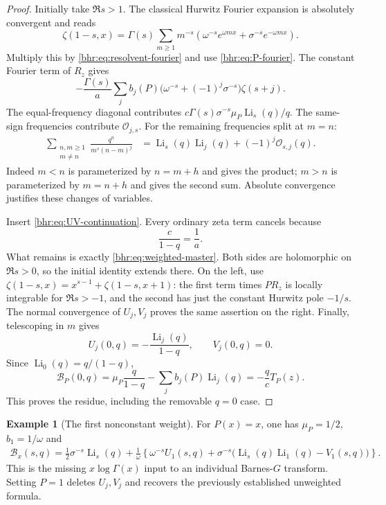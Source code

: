 \documentclass[11pt]{article}
\numberwithin{equation}{section}
\theoremstyle{plain}
\theoremstyle{definition}
\newtheorem{example}[theorem]{Example}
\theoremstyle{remark}
\DeclareMathOperator{\Li}{Li}
\begin{document}
\begin{proof}
Initially take $\Re s>1$. The classical Hurwitz Fourier expansion
\cite[\S25.11]{bhr:DLMFZ} is absolutely convergent and reads
\begin{equation}\label{bhr:eq:hurwitz-fourier}
 \zeta(1-s,x)=\Gamma(s)\sum_{m\ge1}m^{-s}
       \left(\omega^{-s}e^{\omega mx}
                         +\sigma^{-s}e^{-\omega mx}\right).
\end{equation}
Multiply this by \eqref{bhr:eq:resolvent-fourier} and use
\eqref{bhr:eq:P-fourier}. The constant Fourier term of $R_z$ gives
\[
 -\frac{\Gamma(s)}a\sum_j b_j(P)
        \bigl(\omega^{-s}+(-1)^j\sigma^{-s}\bigr)\zeta(s+j).
\]
The equal-frequency diagonal contributes
$c\Gamma(s)\sigma^{-s}\mu_P\Li_s(q)/q$.
The same-sign frequencies contribute $\mathcal O_{j,s}$.
For the remaining frequencies split at $m=n$:
\begin{align}\label{bhr:eq:lattice-splitting}
 \sum_{\substack{n,m\ge1\\m\ne n}}
    \frac{q^n}{m^s(n-m)^j}
 &=\Li_s(q)\Li_j(q)+(-1)^j\mathcal O_{s,j}(q).
\end{align}
Indeed $m<n$ is parameterized by $n=m+h$ and gives the
product; $m>n$ is parameterized by $m=n+h$ and gives the second
sum. Absolute convergence justifies these changes of variables.

Insert \eqref{bhr:eq:UV-continuation}. Every ordinary zeta term
cancels because
\begin{equation}\label{bhr:eq:coefficient-cancellation}
 \frac{c}{1-q}=\frac1a.
\end{equation}
What remains is exactly \eqref{bhr:eq:weighted-master}.
Both sides are holomorphic on $\Re s>0$, so the initial identity
extends there. On the left, use
$\zeta(1-s,x)=x^{s-1}+\zeta(1-s,x+1)$:
the first term times $P R_z$ is locally integrable for $\Re s>-1$,
and the second has just the constant Hurwitz pole $-1/s$.
The normal convergence of $U_j,V_j$ proves the same assertion
on the right. Finally, telescoping in $m$ gives
\[
 U_j(0,q)=-\frac{\Li_j(q)}{1-q},\qquad V_j(0,q)=0.
\]
Since $\Li_0(q)=q/(1-q)$,
\begin{equation}\label{bhr:eq:Bzero}
 \mathcal B_P(0,q)=\mu_P\frac{q}{1-q}
                     -\sum_jb_j(P)\Li_j(q)=-\frac q c T_P(z).
\end{equation}
This proves the residue, including the removable $q=0$ case.
\end{proof}

\begin{example}[The first nonconstant weight]\label{bhr:ex:xweight}
For $P(x)=x$, one has $\mu_P=1/2$, $b_1=1/\omega$ and
\begin{align}
 \mathcal B_x(s,q)
  =\frac12\sigma^{-s}\Li_s(q)
   +\frac1\omega\left\{\omega^{-s}U_1(s,q)
       +\sigma^{-s}\bigl(\Li_s(q)\Li_1(q)-V_1(s,q)\bigr)\right\}.
 \label{bhr:eq:xweight}
\end{align}
This is the missing $x\log\Gamma(x)$ input to an individual
Barnes-$G$ transform. Setting $P=1$ deletes $U_j,V_j$ and
recovers the previously established unweighted formula.
\end{example}
\end{document}
